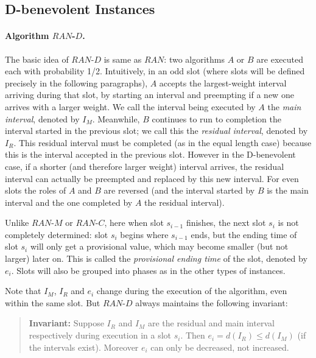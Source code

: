 \documentclass[11pt]{article}
\begin{document}
\subsection{D-benevolent Instances}

\paragraph{Algorithm $RAN$-$D$.}
The basic idea of $RAN$-$D$ is same as $RAN$: 
two algorithms $A$ or $B$ are executed each with probability 1/2.
Intuitively, in an odd slot (where slots will be defined precisely 
in the following paragraphs), 
$A$ accepts the largest-weight interval arriving during that slot, 
by starting an interval
and preempting if a new one arrives with a larger weight. We call the
interval being executed by $A$ the {\it main interval}, denoted by $I_M$. 
Meanwhile, $B$
continues to run to completion the interval started in the previous slot;
we call this the {\it residual interval}, denoted by $I_R$.
This residual interval must be completed 
(as in the equal length case) because this is the interval accepted in the
previous slot. However in the D-benevolent case, 
if a shorter (and therefore larger weight) interval arrives, 
the residual interval can actually be preempted and replaced by this new
interval.  
For even slots the roles of $A$ and $B$ are reversed (and the interval
started by $B$ is the main interval and the one completed by $A$ the
residual interval).

Unlike $RAN$-$M$ or $RAN$-$C$, here when slot $s_{i-1}$ finishes, 
the next slot $s_i$ is not completely determined: 
slot $s_i$ begins where $s_{i-1}$ ends,
but the ending time of slot $s_i$ will only get a provisional value, 
which may become smaller (but not larger) later on. 
This is called the {\it provisional ending time} of the slot, 
denoted by $e_i$.
Slots will also be grouped into phases as in the other types of instances.

Note that $I_M$, $I_R$ and $e_i$ change during the execution of the
algorithm, even within the same slot. 
But $RAN$-$D$ always maintains the following invariant:

\begin{quote}
{\bf Invariant:} 
Suppose $I_R$ and $I_M$ are the residual and main interval respectively
during execution in a slot $s_i$.
Then $e_i = d(I_R) \le d(I_M)$ (if the intervals exist).
Moreover $e_i$ can only be decreased, not increased.
\end{quote}
\end{document}
